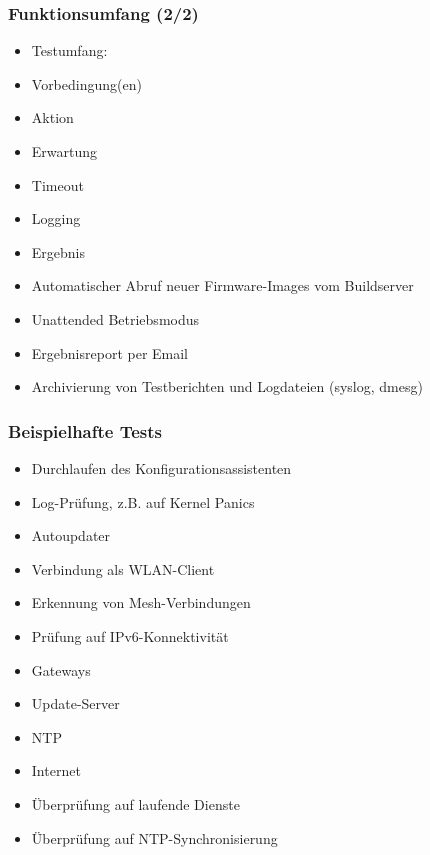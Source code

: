 \documentclass[accentcolor=tud6b,colorbacktitle,inverttitle,landscape,german,presentation,t]{tudbeamer}
\begin{document}
	\begin{frame}
		\frametitle{Funktionsumfang (2/2)}
		\begin{itemize}
			\item Testumfang:
			\item Vorbedingung(en)
			\item Aktion
			\item Erwartung
			\item Timeout
			\item Logging
			\item Ergebnis
			\item Automatischer Abruf neuer Firmware-Images vom Buildserver
			\item Unattended Betriebsmodus
			\item Ergebnisreport per Email
			\item Archivierung von Testberichten und Logdateien (syslog, dmesg)
		\end{itemize}	
	\end{frame}
	
	\begin{frame}
		\frametitle{Beispielhafte Tests}
		\begin{itemize}
		    \item Durchlaufen des Konfigurationsassistenten
		    \item Log-Prüfung, z.B. auf Kernel Panics
		    \item Autoupdater
		    \item Verbindung als WLAN-Client
		    \item Erkennung von Mesh-Verbindungen
		    \item Prüfung auf IPv6-Konnektivität
		    \item Gateways
		    \item Update-Server
		    \item NTP
		    \item Internet
		    \item Überprüfung auf laufende Dienste
		    \item Überprüfung auf NTP-Synchronisierung
 		\end{itemize}
	\end{frame}
\end{document}

